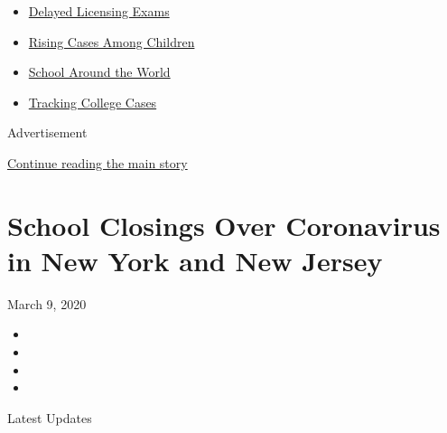 \begin{itemize}
\tightlist
\item
  \href{https://www.nytimes3xbfgragh.onion/2020/09/04/us/bar-exam-coronavirus.html?name=styln-coronavirus-schools-reopening\&region=TOP_BANNER\&block=storyline_menu_recirc\&action=click\&pgtype=Interactive\&impression_id=f07eaa91-efba-11ea-9794-7776d1fd3dae\&variant=undefined}{Delayed
  Licensing Exams}
\item
  \href{https://www.nytimes3xbfgragh.onion/interactive/2020/08/31/us/coronavirus-cases-children.html?name=styln-coronavirus-schools-reopening\&region=TOP_BANNER\&block=storyline_menu_recirc\&action=click\&pgtype=Interactive\&impression_id=f07ed1a0-efba-11ea-9794-7776d1fd3dae\&variant=undefined}{Rising
  Cases Among Children}
\item
  \href{https://www.nytimes3xbfgragh.onion/2020/09/01/world/schools-reopen-globe-students.html?name=styln-coronavirus-schools-reopening\&region=TOP_BANNER\&block=storyline_menu_recirc\&action=click\&pgtype=Interactive\&impression_id=f07ed1a1-efba-11ea-9794-7776d1fd3dae\&variant=undefined}{School
  Around the World}
\item
  \href{https://www.nytimes3xbfgragh.onion/interactive/2020/us/covid-college-cases-tracker.html?name=styln-coronavirus-schools-reopening\&region=TOP_BANNER\&block=storyline_menu_recirc\&action=click\&pgtype=Interactive\&impression_id=f07ed1a2-efba-11ea-9794-7776d1fd3dae\&variant=undefined}{Tracking
  College Cases}
\end{itemize}

Advertisement

\protect\hyperlink{after-top}{Continue reading the main story}

\hypertarget{school-closings-over-coronavirus-in-new-york-and-new-jersey}{%
\section{School Closings Over Coronavirus in New York and New
Jersey}\label{school-closings-over-coronavirus-in-new-york-and-new-jersey}}

March 9, 2020

\begin{itemize}
\item
\item
\item
\item
\end{itemize}

Latest Updates

